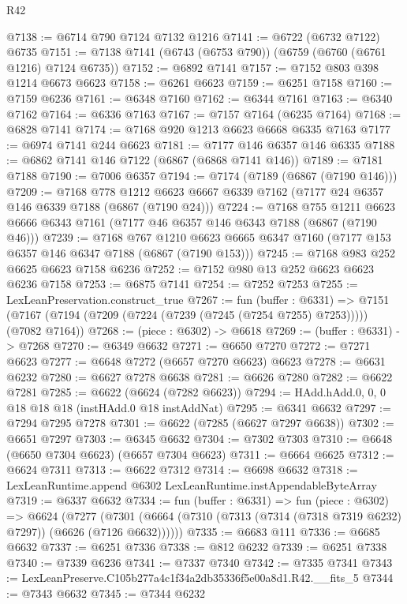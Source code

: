 \begin{lexlean}{R42}
\begin{coremodule}
{@7138 := @6714 @790 @7124 @7132 @1216
@7141 := @6722 (@6732 @7122) @6735
@7151 := @7138 @7141 (@6743 (@6753 @790)) (@6759 (@6760 (@6761 @1216) @7124 @6735))
@7152 := @6892 @7141
@7157 := @7152 @803 @398 @1214 @6673 @6623
@7158 := @6261 @6623
@7159 := @6251 @7158
@7160 := @7159 @6236
@7161 := @6348 @7160
@7162 := @6344 @7161
@7163 := @6340 @7162
@7164 := @6336 @7163
@7167 := @7157 @7164 (@6235 @7164)
@7168 := @6828 @7141
@7174 := @7168 @920 @1213 @6623 @6668 @6335 @7163
@7177 := @6974 @7141 @244 @6623
@7181 := @7177 @146 @6357 @146 @6335
@7188 := @6862 @7141 @146 @7122 (@6867 (@6868 @7141 @146))
@7189 := @7181 @7188
@7190 := @7006 @6357
@7194 := @7174 (@7189 (@6867 (@7190 @146)))
@7209 := @7168
    @778
    @1212
    @6623
    @6667
    @6339
    @7162
    (@7177 @24 @6357 @146 @6339 @7188 (@6867 (@7190 @24)))
@7224 := @7168
    @755
    @1211
    @6623
    @6666
    @6343
    @7161
    (@7177 @46 @6357 @146 @6343 @7188 (@6867 (@7190 @46)))
@7239 := @7168
    @767
    @1210
    @6623
    @6665
    @6347
    @7160
    (@7177 @153 @6357 @146 @6347 @7188 (@6867 (@7190 @153)))
@7245 := @7168 @983 @252 @6625 @6623 @7158 @6236
@7252 := @7152 @980 @13 @252 @6623 @6623 @6236 @7158
@7253 := @6875 @7141
@7254 := @7252 @7253
@7255 := LexLeanPreservation.construct_true
@7267 := fun (buffer : @6331) =>
  @7151 (@7167 (@7194 (@7209 (@7224 (@7239 (@7245 (@7254 @7255) @7253))))) (@7082 @7164))
@7268 := (piece : @6302) -> @6618
@7269 := (buffer : @6331) -> @7268
@7270 := @6349 @6632
@7271 := @6650 @7270
@7272 := @7271 @6623
@7277 := @6648 @7272 (@6657 @7270 @6623) @6623
@7278 := @6631 @6232
@7280 := @6627 @7278 @6638
@7281 := @6626 @7280
@7282 := @6622 @7281
@7285 := @6622 (@6624 (@7282 @6623))
@7294 := HAdd.hAdd.{0, 0, 0} @18 @18 @18 (instHAdd.{0} @18 instAddNat)
@7295 := @6341 @6632
@7297 := @7294 @7295 @7278
@7301 := @6622 (@7285 (@6627 @7297 @6638))
@7302 := @6651 @7297
@7303 := @6345 @6632
@7304 := @7302 @7303
@7310 := @6648 (@6650 @7304 @6623) (@6657 @7304 @6623)
@7311 := @6664 @6625
@7312 := @6624 @7311
@7313 := @6622 @7312
@7314 := @6698 @6632
@7318 := LexLeanRuntime.append @6302 LexLeanRuntime.instAppendableByteArray
@7319 := @6337 @6632
@7334 := fun (buffer : @6331) =>
  fun (piece : @6302) =>
  @6624
    (@7277 (@7301 (@6664 (@7310 (@7313 (@7314 (@7318 @7319 @6232) @7297)) (@6626 (@7126 @6632))))))
@7335 := @6683 @111
@7336 := @6685 @6632
@7337 := @6251 @7336
@7338 := @812 @6232
@7339 := @6251 @7338
@7340 := @7339 @6236
@7341 := @7337 @7340
@7342 := @7335 @7341
@7343 := LexLeanPreserve.C105b277a4c1f34a2db35336f5e00a8d1.R42.__fits_5
@7344 := @7343 @6632
@7345 := @7344 @6232
}
\end{coremodule}
\end{lexlean}
